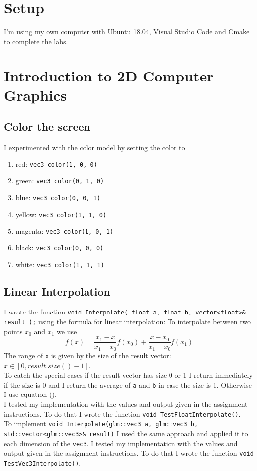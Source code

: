 \section{Setup} 
I'm using my own computer with Ubuntu 18.04, Visual Studio Code and Cmake to complete the labs.

\section{Introduction to 2D Computer Graphics}

\subsection{Color the screen}
I experimented with the color model by setting the color to 
\begin{enumerate}
    \item red: \texttt{vec3 color(1, 0, 0)}
    \item green: \texttt{vec3 color(0, 1, 0)}
    \item blue: \texttt{vec3 color(0, 0, 1)}
    \item yellow: \texttt{vec3 color(1, 1, 0)}
    \item magenta: \texttt{vec3 color(1, 0, 1)}
    \item black: \texttt{vec3 color(0, 0, 0)}
    \item white: \texttt{vec3 color(1, 1, 1)}
\end{enumerate}

\subsection{Linear Interpolation}
I wrote the function \texttt{void Interpolate( float a, float b, vector<float>\& result );} using the formula for linear interpolation:
To interpolate between two points \(x_0\) and \(x_1\) we use
\begin{equation}\label{eq:lin_inter}
    f(x)=\frac{x_1-x}{x_1-x_0}f(x_0)+\frac{x-x_0}{x_1-x_0}f(x_1)
\end{equation}
The range of \texttt{x} is given by the size of the result vector: \(x \in [0, result.size()-1]\).\\
To catch the special cases if the result vector has size 0 or 1 I return immediately if the size is 0 and I return the average of \texttt{a} and \texttt{b} in
case the size is 1. Otherwise I use equation ().\\
I tested my implementation with the values and output given in the assignment instructions. To do that I wrote the function \texttt{void TestFloatInterpolate()}.\\
To implement \texttt{void Interpolate(glm::vec3 a, glm::vec3 b, std::vector<glm::vec3>\& result)} I used the same approach and applied it to each dimension of the 
\texttt{vec3}.
I tested my implementation with the values and output given in the assignment instructions. To do that I wrote the function \texttt{void TestVec3Interpolate()}.
\newpage
